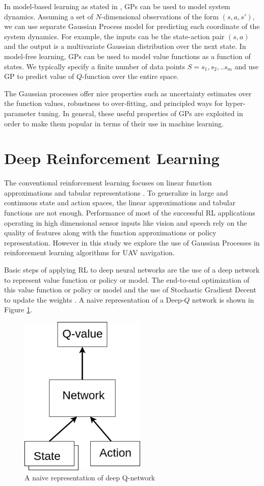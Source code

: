 \documentclass[12pt]{report}
\begin{document}
In model-based learning as stated in \cite{rasmussen2003gaussian}, GPs can be used to model system dynamics. Assuming a set of $N$-dimensional observations of the form $(s,a,s')$, we can use separate Gaussian Process model for predicting each coordinate of the system dynamics. For example, the inputs can be the state-action pair $(s,a)$ and the output is a multivariate Gaussian distribution over the next state. In model-free learning, GPs can be used to model value functions as a function of states. We typically specify a finite number of data points $S=s_1,s_2,..s_m$ and use GP to predict value of $Q$-function over the entire space. \par 
The Gaussian processes offer nice properties such as uncertainty estimates over the function values, robustness to over-fitting, and principled ways for hyper-parameter tuning. In general, these useful properties of GPs are exploited in order to make them popular in terms of their use in machine learning. 
 
\section{Deep Reinforcement Learning}
\label{deep_rl_section}
The conventional reinforcement learning focuses on linear function approximations and tabular representations \cite{gamedeep}. To generalize in large and continuous state and action spaces, the linear approximations and tabular functions are not enough\cite{morton2016deep}. Performance of most of the successful RL applications operating in high dimensional sensor inputs like vision and speech rely on the quality of features along with the function approximations or policy representation. However in this study we explore the use of Gaussian Processes in reinforcement learning algorithms for UAV navigation.\par 

Basic steps of applying RL to deep neural networks are the use of a deep network to represent value function or policy or model. The end-to-end optimization of this value function or policy or model and the use of Stochastic Gradient Decent to update the weights \cite{mnih2013playing}.
A naive representation of a Deep-$Q$ network is shown in Figure \ref{fig:deep_q}.
\begin{figure}[H]
	\centering
	\includegraphics[width=6cm]{deep_q.png}
	\caption {A naive representation of deep Q-network}
   \label{fig:deep_q}
\end{figure}
\end{document}
